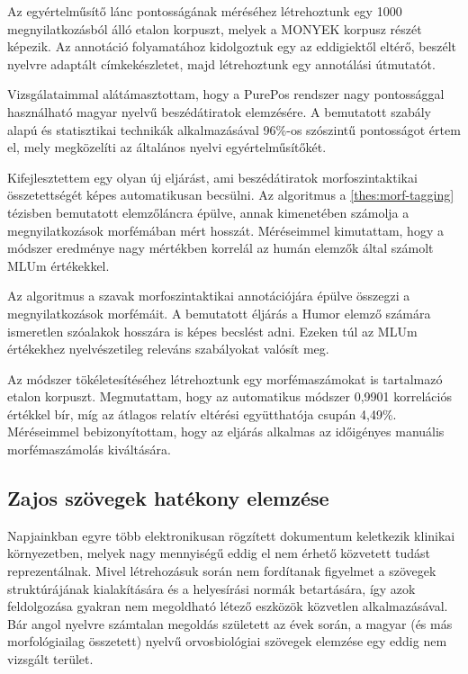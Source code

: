 Az egyértelműsítő lánc pontosságának méréséhez létrehoztunk egy 1000 megnyilatkozásból álló etalon korpuszt, melyek a MONYEK \cite{Matyus2014} korpusz részét képezik. 
Az annotáció folyamatához kidolgoztuk egy az eddigiektől eltérő, beszélt nyelvre adaptált címkekészletet, majd létrehoztunk egy annotálási útmutatót.

Vizsgálataimmal alátámasztottam, hogy a PurePos rendszer nagy pontossággal használható magyar nyelvű beszédátiratok elemzésére. 
A bemutatott szabály alapú és statisztikai technikák alkalmazásával 96\%-os szószintű pontosságot értem el, mely megközelíti az általános nyelvi egyértelműsítőkét.


\thesisline%


\begin{core}
\begin{thesis}
Kifejlesztettem egy olyan új eljárást, ami beszédátiratok morfoszintaktikai összetettségét képes automatikusan becsülni.
Az algoritmus a \ref{thes:morf-tagging} tézisben bemutatott elemzőláncra épülve, annak kimenetében számolja a megnyilatkozások morfémában mért hosszát. 
Méréseimmel kimutattam, hogy a módszer eredménye nagy mértékben korrelál az humán elemzők által számolt MLUm értékekkel.
\end{thesis}

\begin{pub}
\cite{Matyus2014,Orosz2014c}
\end{pub}
\end{core}

Az algoritmus a szavak morfoszintaktikai annotációjára épülve összegzi a megnyilatkozások morfémáit.
A bemutatott éljárás a Humor elemző számára ismeretlen szóalakok hosszára is képes becslést adni.
Ezeken túl az MLUm értékekhez nyelvészetileg releváns szabályokat valósít meg.

Az módszer tökéletesítéséhez létrehoztunk egy morfémaszámokat is tartalmazó etalon korpuszt. 
Megmutattam, hogy az automatikus módszer 0,9901 korrelációs értékkel bír, míg az átlagos relatív eltérési együtthatója csupán 4,49\%. 
Méréseimmel bebizonyítottam, hogy az eljárás alkalmas az időigényes manuális morfémaszámolás kiváltására.

\subsection{Zajos szövegek hatékony elemzése}

Napjainkban egyre több elektronikusan rögzített dokumentum keletkezik klinikai környezetben, melyek nagy mennyiségű eddig el nem érhető közvetett tudást reprezentálnak. 
Mivel létrehozásuk során nem fordítanak figyelmet a szövegek struktúrájának kialakítására és a helyesírási normák betartására, így azok feldolgozása gyakran nem megoldható létező eszközök közvetlen alkalmazásával. 
Bár angol nyelvre számtalan megoldás született az évek során, a magyar (és más morfológiailag összetett) nyelvű orvosbiológiai szövegek elemzése egy eddig nem vizsgált terület.

